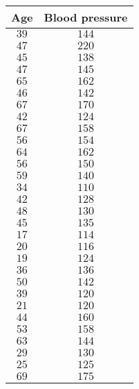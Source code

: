 \begin{tabular}{cc}     \toprule
Age  & Blood pressure \\\midrule
$39$ & $144$          \\
$47$ & $220$          \\
$45$ & $138$          \\
$47$ & $145$          \\
$65$ & $162$          \\
$46$ & $142$          \\
$67$ & $170$          \\
$42$ & $124$          \\
$67$ & $158$          \\
$56$ & $154$          \\
$64$ & $162$          \\
$56$ & $150$          \\
$59$ & $140$          \\
$34$ & $110$          \\
$42$ & $128$          \\
$48$ & $130$          \\
$45$ & $135$          \\
$17$ & $114$          \\
$20$ & $116$          \\
$19$ & $124$          \\
$36$ & $136$          \\
$50$ & $142$          \\
$39$ & $120$          \\
$21$ & $120$          \\
$44$ & $160$          \\
$53$ & $158$          \\
$63$ & $144$          \\
$29$ & $130$          \\
$25$ & $125$          \\
$69$ & $175$          \\\bottomrule
\end{tabular}
